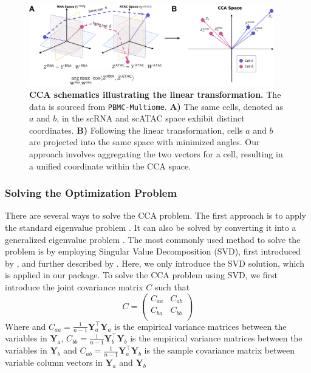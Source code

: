 \begin{figure}[!ht]
	\centering
	\includegraphics[width=0.95\textwidth]{CCA_ADD/fig}
	\vspace{0.1cm}
	\caption[CCA schematic showing the linear transformation.]{\textbf{CCA schematics illustrating the linear transformation.} The data is sourced from \texttt{PBMC-Multiome}. \textbf{A)} The same cells, denoted as $a$ and $b$, in the scRNA and scATAC space exhibit distinct coordinates. \textbf{B)} Following the linear transformation, cells $a$ and $b$ are projected into the same space with minimized angles. Our approach involves aggregating the two vectors for a cell, resulting in a unified coordinate within the CCA space.}
	\label{fig:CC_pval_select}
\end{figure}

\subsubsection{Solving the Optimization Problem}
There are several ways to solve the CCA problem. The first approach is to apply the standard eigenvalue problem \citep{HOTELLING1936cca2,hooper1959ccaeigen}. It can also be solved by converting it into a generalized eigenvalue problem \citep{bach2002kernel,hardoon2004canonical}. The most commonly used method to solve the problem is by employing Singular Value Decomposition (SVD), first introduced by \citep{healy1957ccasvd}, and further described by \citep{ewerbring1989canonical}. Here, we only introduce the SVD solution, which is applied in our package.
To solve the CCA problem using SVD, we first introduce the joint covariance matrix $C$ such that
\begin{equation}
	C = \begin{pmatrix}
		C_{aa} & C_{ab}\\
		C_{ba} & C_{bb}\\
	\end{pmatrix}	
\end{equation}
Where  and $C_{aa} = \frac{1}{n-1} \mathbf{Y}_a^\top \mathbf{Y}_a$ is the empirical variance matrices between the variables in $\mathbf{Y}_a$, $C_{bb} = \frac{1}{n-1} \mathbf{Y}_b^\top \mathbf{Y}_b$ is the empirical variance matrices between the variables in $\mathbf{Y}_b$ and $C_{ab} = \frac{1}{n-1} \mathbf{Y}_a^\top \mathbf{Y}_b$ is the sample covariance matrix between variable column vectors in $\mathbf{Y}_a$ and $\mathbf{Y}_b$

